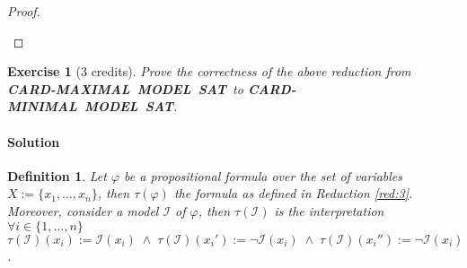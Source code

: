 \documentclass [11pt]{article}
\newcommand{\MINCARDSAT}{\mbox{\bf CARD-MINIMAL MODEL SAT}}
\newcommand{\MAXCARDSAT}{\mbox{\bf CARD-MAXIMAL MODEL SAT}}
\newcommand{\LogMAXLEXSAT}{\mbox{\bf LogLEX-MAXIMAL MODEL SAT}}
\newcommand{\nmodels}{\not\models}
\newtheorem{definition}[theorem]{Definition}
\newtheorem{exercise}[theorem]{Exercise}
\begin{document}
\begin{proof}
\begin{itemize}
%
%
\end{itemize}

\end{proof}


\newpage


\begin{exercise}[3 credits]
{\em 
Prove the correctness of the above 
reduction
from \\
\MAXCARDSAT\ to 
\MINCARDSAT.
}%
\end{exercise}
\paragraph*{Solution}

\begin{definition}
Let $\varphi$ be a propositional formula over the set of variables $X:=\{x_1,\dots , x_n\}$, then $\tau(\varphi)$ the formula as defined in Reduction \ref{red:3}.
Moreover, consider a model $\mathcal{I}$ of $\varphi$, then $\tau(\mathcal{I})$ is the interpretation $ \forall i \in \{1,\dots, n\}$ $\tau(\mathcal{I})(x_i):=\mathcal{I}(x_i) \;  \land  \; \tau(\mathcal{I})(x_i'):=\neg \mathcal{I}(x_i)  \;  \land \;  \tau(\mathcal{I})(x_i''):=\neg \mathcal{I}(x_i)$. 

\end{definition}
\end{document}
